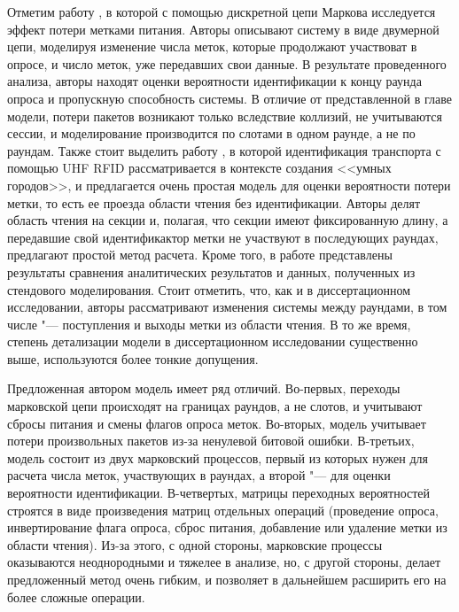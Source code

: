 Отметим работу \cite{Vales-Alonso2017}, в которой с помощью дискретной цепи Маркова исследуется эффект потери метками питания. Авторы описывают систему в виде двумерной цепи, моделируя изменение числа меток, которые продолжают участвоват в опросе, и число меток, уже передавших свои данные. В результате проведенного анализа, авторы находят оценки вероятности идентификации к концу раунда опроса и пропускную способность системы. В отличие от представленной в главе модели, потери пакетов возникают только вследствие коллизий, не учитываются сессии, и моделирование производится по слотами в одном раунде, а не по раундам. Также стоит выделить работу \cite{Pawowicz2020}, в которой идентификация транспорта с помощью UHF RFID рассматривается в контексте создания <<умных городов>>, и предлагается очень простая модель для оценки вероятности потери метки, то есть ее проезда области чтения без идентификации. Авторы делят область чтения на секции и, полагая, что секции имеют фиксированную длину, а передавшие свой идентификактор метки не участвуют в последующих раундах, предлагают простой метод расчета. Кроме того, в работе представлены результаты сравнения аналитических результатов и данных, полученных из стендового моделирования. Стоит отметить, что, как и в диссертационном исследовании, авторы \cite{Pawowicz2020} рассматривают изменения системы между раундами, в том числе "--- поступления и выходы метки из области чтения. В то же время, степень детализации модели в диссертационном исследовании существенно выше, используются более тонкие допущения.

Предложенная автором модель имеет ряд отличий. Во-первых, переходы марковской цепи происходят на границах раундов, а не слотов, и учитывают сбросы питания и смены флагов опроса меток. Во-вторых, модель учитывает потери произвольных пакетов из-за ненулевой битовой ошибки. В-третьих, модель состоит из двух марковский процессов, первый из которых нужен для расчета числа меток, участвующих в раундах, а второй "--- для оценки вероятности идентификации. В-четвертых, матрицы переходных вероятностей строятся в виде произведения матриц отдельных операций (проведение опроса, инвертирование флага опроса, сброс питания, добавление или удаление метки из области чтения). Из-за этого, с одной стороны, марковские процессы оказываются неоднородными и тяжелее в анализе, но, с другой стороны, делает предложенный метод очень гибким, и позволяет в дальнейшем расширить его на более сложные операции.





